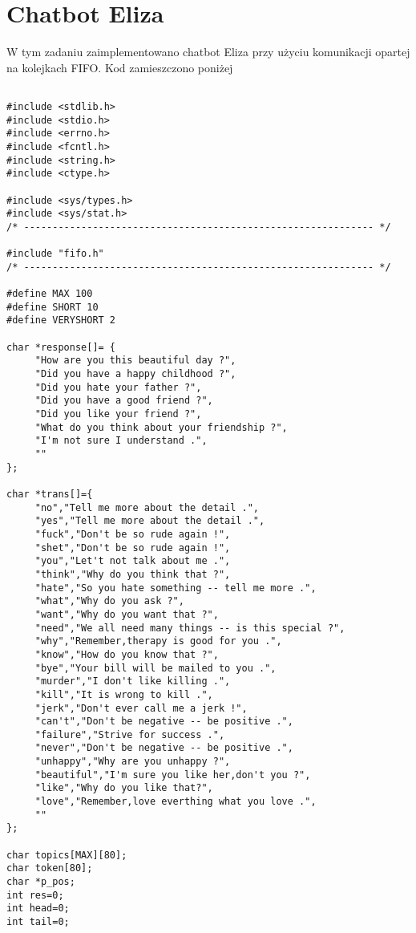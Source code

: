 \documentclass[a4paper,15pt]{article}
\begin{document}
\section{Chatbot Eliza}

W tym zadaniu zaimplementowano chatbot Eliza przy użyciu komunikacji opartej na kolejkach FIFO. Kod zamieszczono poniżej

\begin{lstlisting}[style=CStyle, label=some-code, caption=srveliza.c]

#include <stdlib.h>
#include <stdio.h>
#include <errno.h>
#include <fcntl.h>
#include <string.h>
#include <ctype.h>

#include <sys/types.h>
#include <sys/stat.h>
/* ------------------------------------------------------------- */

#include "fifo.h"
/* ------------------------------------------------------------- */

#define MAX 100
#define SHORT 10
#define VERYSHORT 2

char *response[]= {
     "How are you this beautiful day ?",
     "Did you have a happy childhood ?",
     "Did you hate your father ?",
     "Did you have a good friend ?",
     "Did you like your friend ?",
     "What do you think about your friendship ?",
     "I'm not sure I understand .",
     ""
};

char *trans[]={
     "no","Tell me more about the detail .",
     "yes","Tell me more about the detail .",
     "fuck","Don't be so rude again !",
     "shet","Don't be so rude again !",
     "you","Let't not talk about me .",
     "think","Why do you think that ?",
     "hate","So you hate something -- tell me more .",
     "what","Why do you ask ?",
     "want","Why do you want that ?",
     "need","We all need many things -- is this special ?",
     "why","Remember,therapy is good for you .",
     "know","How do you know that ?",
     "bye","Your bill will be mailed to you .",
     "murder","I don't like killing .",
     "kill","It is wrong to kill .",
     "jerk","Don't ever call me a jerk !",
     "can't","Don't be negative -- be positive .",
     "failure","Strive for success .",
     "never","Don't be negative -- be positive .",
     "unhappy","Why are you unhappy ?",
     "beautiful","I'm sure you like her,don't you ?",
     "like","Why do you like that?",
     "love","Remember,love everthing what you love .",
     ""
};

char topics[MAX][80];
char token[80];
char *p_pos;
int res=0;
int head=0;
int tail=0;


\end{lstlisting}
\end{document}

